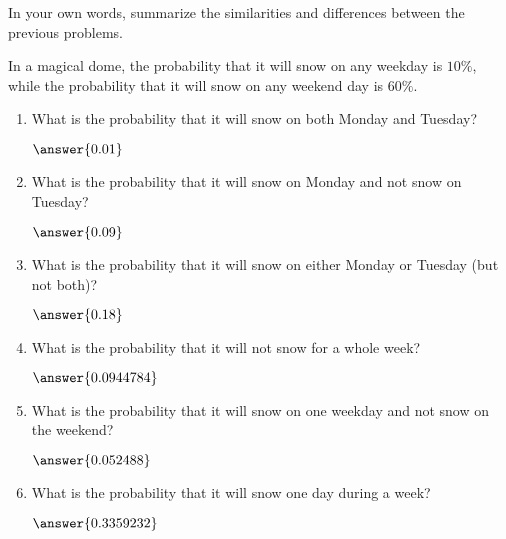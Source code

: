 \documentclass[nooutcomes]{ximera}
\begin{document}
\begin{problem}
In your own words, summarize the similarities and differences between the previous problems.

\begin{freeResponse}
\end{freeResponse}
\end{problem}



\begin{problem}
In a magical dome, the probability that it will snow on any weekday is $10\%$, while the probability that it will snow on any weekend day is $60\%$.

\begin{enumerate}
	\item What is the probability that it will snow on both Monday and Tuesday? \begin{prompt} $\answer{0.01}$ \end{prompt}
	\item What is the probability that it will snow on Monday and not snow on Tuesday? \begin{prompt} $\answer{0.09}$ \end{prompt}
	\item What is the probability that it will snow on either Monday or Tuesday (but not both)? \begin{prompt} $\answer{0.18}$ \end{prompt}
	\item What is the probability that it will not snow for a whole week? \begin{prompt} $\answer{0.0944784}$ \end{prompt}
	\item What is the probability that it will snow on one weekday and not snow on the weekend? \begin{prompt} $\answer{0.052488}$ \end{prompt}
	\item What is the probability that it will snow one day during a week? \begin{prompt} $\answer{0.3359232}$ \end{prompt}
\end{enumerate}
\end{problem}
\end{document}
